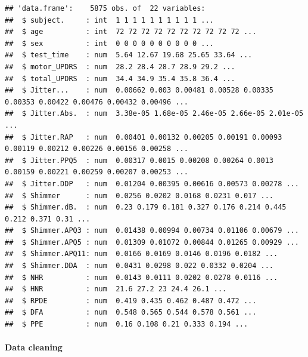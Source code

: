 \documentclass[
]{article}
\newenvironment{Shaded}{\begin{snugshade}}{\end{snugshade}}
\newcommand{\DecValTok}[1]{\textcolor[rgb]{0.00,0.00,0.81}{#1}}
\newcommand{\FunctionTok}[1]{\textcolor[rgb]{0.13,0.29,0.53}{\textbf{#1}}}
\newcommand{\NormalTok}[1]{#1}
\newcommand{\OtherTok}[1]{\textcolor[rgb]{0.56,0.35,0.01}{#1}}
\newcommand{\SpecialCharTok}[1]{\textcolor[rgb]{0.81,0.36,0.00}{\textbf{#1}}}
\newcommand{\StringTok}[1]{\textcolor[rgb]{0.31,0.60,0.02}{#1}}
\begin{document}
\begin{verbatim}
## 'data.frame':    5875 obs. of  22 variables:
##  $ subject.     : int  1 1 1 1 1 1 1 1 1 1 ...
##  $ age          : int  72 72 72 72 72 72 72 72 72 72 ...
##  $ sex          : int  0 0 0 0 0 0 0 0 0 0 ...
##  $ test_time    : num  5.64 12.67 19.68 25.65 33.64 ...
##  $ motor_UPDRS  : num  28.2 28.4 28.7 28.9 29.2 ...
##  $ total_UPDRS  : num  34.4 34.9 35.4 35.8 36.4 ...
##  $ Jitter...    : num  0.00662 0.003 0.00481 0.00528 0.00335 0.00353 0.00422 0.00476 0.00432 0.00496 ...
##  $ Jitter.Abs.  : num  3.38e-05 1.68e-05 2.46e-05 2.66e-05 2.01e-05 ...
##  $ Jitter.RAP   : num  0.00401 0.00132 0.00205 0.00191 0.00093 0.00119 0.00212 0.00226 0.00156 0.00258 ...
##  $ Jitter.PPQ5  : num  0.00317 0.0015 0.00208 0.00264 0.0013 0.00159 0.00221 0.00259 0.00207 0.00253 ...
##  $ Jitter.DDP   : num  0.01204 0.00395 0.00616 0.00573 0.00278 ...
##  $ Shimmer      : num  0.0256 0.0202 0.0168 0.0231 0.017 ...
##  $ Shimmer.dB.  : num  0.23 0.179 0.181 0.327 0.176 0.214 0.445 0.212 0.371 0.31 ...
##  $ Shimmer.APQ3 : num  0.01438 0.00994 0.00734 0.01106 0.00679 ...
##  $ Shimmer.APQ5 : num  0.01309 0.01072 0.00844 0.01265 0.00929 ...
##  $ Shimmer.APQ11: num  0.0166 0.0169 0.0146 0.0196 0.0182 ...
##  $ Shimmer.DDA  : num  0.0431 0.0298 0.022 0.0332 0.0204 ...
##  $ NHR          : num  0.0143 0.0111 0.0202 0.0278 0.0116 ...
##  $ HNR          : num  21.6 27.2 23 24.4 26.1 ...
##  $ RPDE         : num  0.419 0.435 0.462 0.487 0.472 ...
##  $ DFA          : num  0.548 0.565 0.544 0.578 0.561 ...
##  $ PPE          : num  0.16 0.108 0.21 0.333 0.194 ...
\end{verbatim}

\hypertarget{data-cleaning}{%
\paragraph{Data cleaning}\label{data-cleaning}}

\begin{Shaded}
\end{Shaded}
\end{document}
